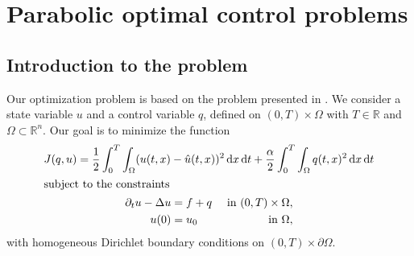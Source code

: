 \chapter{Parabolic optimal control problems}

\section{Introduction to the problem}
Our optimization problem is based on the problem presented in \cite{doi:10.1137/070694016}. We consider a state variable $u$ and a control variable $q$, defined on $(0,T)\times\Omega$ with $T\in\mathbb{R}$ and $\Omega\subset\mathbb{R}^n$. Our goal is to minimize the function
\begin{subequations}
\label{conProb}
\begin{gather}
J(q,u)=\frac{1}{2}\int_0^T\int_\Omega(u(t,x)-\hat{u}(t,x))^2\,\mathrm{d}x\,\mathrm{d}t+\frac{\alpha}{2}\int_0^T\int_\Omega q(t,x)^2\,\mathrm{d}x\,\mathrm{d}t\label{objFun}\\
\intertext{subject to the constraints}
\begin{aligned}
	\partial_tu-\Delta u&=f+q&\text{ in }(0,T)\times\Omega,\\
	u(0)&=u_0&\text{ in }\Omega,
\end{aligned}
\label{constraints}
\end{gather}
\end{subequations}
with homogeneous Dirichlet boundary conditions on $(0,T)\times\partial\Omega$.

